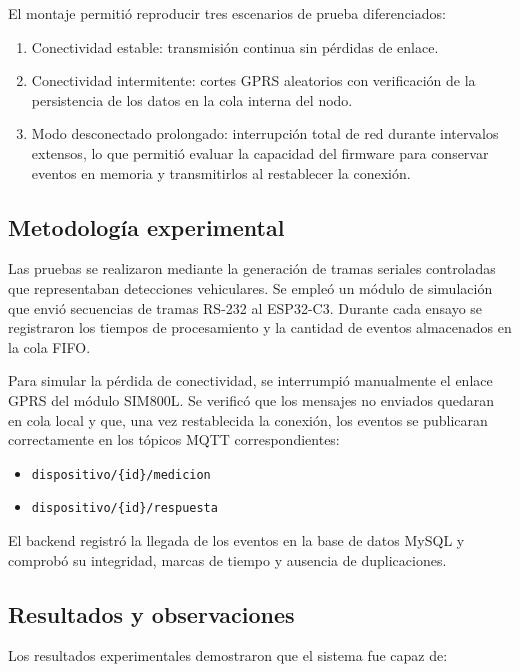 El montaje permitió reproducir tres escenarios de prueba diferenciados:

\begin{enumerate}
    \item Conectividad estable: transmisión continua sin pérdidas de enlace.
    \item Conectividad intermitente: cortes GPRS aleatorios con verificación de la persistencia de los datos en la cola interna del nodo.
    \item Modo desconectado prolongado: interrupción total de red durante intervalos extensos, lo que permitió evaluar la capacidad del firmware para conservar eventos en memoria y transmitirlos al restablecer la conexión.
\end{enumerate}

\subsection{Metodología experimental}

Las pruebas se realizaron mediante la generación de tramas seriales controladas que representaban detecciones vehiculares. 
Se empleó un módulo de simulación que envió secuencias de tramas RS-232 al ESP32-C3. 
Durante cada ensayo se registraron los tiempos de procesamiento y la cantidad de eventos almacenados en la cola FIFO.

Para simular la pérdida de conectividad, se interrumpió manualmente el enlace GPRS del módulo SIM800L. 
Se verificó que los mensajes no enviados quedaran en cola local y que, una vez restablecida la conexión, los eventos se publicaran correctamente en los tópicos MQTT correspondientes:

\begin{itemize}
  \item \texttt{dispositivo/\{id\}/medicion}
  \item \texttt{dispositivo/\{id\}/respuesta}
\end{itemize}

El backend registró la llegada de los eventos en la base de datos MySQL y comprobó su integridad, marcas de tiempo y ausencia de duplicaciones.


\subsection{Resultados y observaciones}

Los resultados experimentales demostraron que el sistema fue capaz de:

